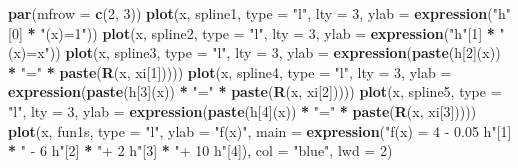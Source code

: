 \documentclass[
]{book}
\newenvironment{Shaded}{\begin{snugshade}}{\end{snugshade}}
\newcommand{\AttributeTok}[1]{\textcolor[rgb]{0.13,0.29,0.53}{#1}}
\newcommand{\DecValTok}[1]{\textcolor[rgb]{0.00,0.00,0.81}{#1}}
\newcommand{\FunctionTok}[1]{\textcolor[rgb]{0.13,0.29,0.53}{\textbf{#1}}}
\newcommand{\NormalTok}[1]{#1}
\newcommand{\SpecialCharTok}[1]{\textcolor[rgb]{0.81,0.36,0.00}{\textbf{#1}}}
\newcommand{\StringTok}[1]{\textcolor[rgb]{0.31,0.60,0.02}{#1}}
\begin{document}
\begin{Shaded}
\begin{Highlighting}[]
\FunctionTok{par}\NormalTok{(}\AttributeTok{mfrow =} \FunctionTok{c}\NormalTok{(}\DecValTok{2}\NormalTok{, }\DecValTok{3}\NormalTok{))}
\FunctionTok{plot}\NormalTok{(x, spline1, }\AttributeTok{type =} \StringTok{"l"}\NormalTok{, }\AttributeTok{lty =} \DecValTok{3}\NormalTok{, }\AttributeTok{ylab =} \FunctionTok{expression}\NormalTok{(}\StringTok{"h"}\NormalTok{[}\DecValTok{0}\NormalTok{] }\SpecialCharTok{*}
    \StringTok{"(x)=1"}\NormalTok{))}
\FunctionTok{plot}\NormalTok{(x, spline2, }\AttributeTok{type =} \StringTok{"l"}\NormalTok{, }\AttributeTok{lty =} \DecValTok{3}\NormalTok{, }\AttributeTok{ylab =} \FunctionTok{expression}\NormalTok{(}\StringTok{"h"}\NormalTok{[}\DecValTok{1}\NormalTok{] }\SpecialCharTok{*}
    \StringTok{"(x)=x"}\NormalTok{))}
\FunctionTok{plot}\NormalTok{(x, spline3, }\AttributeTok{type =} \StringTok{"l"}\NormalTok{, }\AttributeTok{lty =} \DecValTok{3}\NormalTok{, }\AttributeTok{ylab =} \FunctionTok{expression}\NormalTok{(}\FunctionTok{paste}\NormalTok{(h[}\DecValTok{2}\NormalTok{](x)) }\SpecialCharTok{*}
    \StringTok{"="} \SpecialCharTok{*} \FunctionTok{paste}\NormalTok{(}\FunctionTok{R}\NormalTok{(x, xi[}\DecValTok{1}\NormalTok{]))))}
\FunctionTok{plot}\NormalTok{(x, spline4, }\AttributeTok{type =} \StringTok{"l"}\NormalTok{, }\AttributeTok{lty =} \DecValTok{3}\NormalTok{, }\AttributeTok{ylab =} \FunctionTok{expression}\NormalTok{(}\FunctionTok{paste}\NormalTok{(h[}\DecValTok{3}\NormalTok{](x)) }\SpecialCharTok{*}
    \StringTok{"="} \SpecialCharTok{*} \FunctionTok{paste}\NormalTok{(}\FunctionTok{R}\NormalTok{(x, xi[}\DecValTok{2}\NormalTok{]))))}
\FunctionTok{plot}\NormalTok{(x, spline5, }\AttributeTok{type =} \StringTok{"l"}\NormalTok{, }\AttributeTok{lty =} \DecValTok{3}\NormalTok{, }\AttributeTok{ylab =} \FunctionTok{expression}\NormalTok{(}\FunctionTok{paste}\NormalTok{(h[}\DecValTok{4}\NormalTok{](x)) }\SpecialCharTok{*}
    \StringTok{"="} \SpecialCharTok{*} \FunctionTok{paste}\NormalTok{(}\FunctionTok{R}\NormalTok{(x, xi[}\DecValTok{3}\NormalTok{]))))}
\FunctionTok{plot}\NormalTok{(x, fun1s, }\AttributeTok{type =} \StringTok{"l"}\NormalTok{, }\AttributeTok{ylab =} \StringTok{"f(x)"}\NormalTok{, }\AttributeTok{main =} \FunctionTok{expression}\NormalTok{(}\StringTok{"f(x) =  4 {-} 0.05 h"}\NormalTok{[}\DecValTok{1}\NormalTok{] }\SpecialCharTok{*}
    \StringTok{" {-} 6 h"}\NormalTok{[}\DecValTok{2}\NormalTok{] }\SpecialCharTok{*} \StringTok{"+ 2 h"}\NormalTok{[}\DecValTok{3}\NormalTok{] }\SpecialCharTok{*} \StringTok{"+ 10 h"}\NormalTok{[}\DecValTok{4}\NormalTok{]), }\AttributeTok{col =} \StringTok{"blue"}\NormalTok{, }\AttributeTok{lwd =} \DecValTok{2}\NormalTok{)}
\end{Highlighting}
\end{Shaded}
\end{document}
